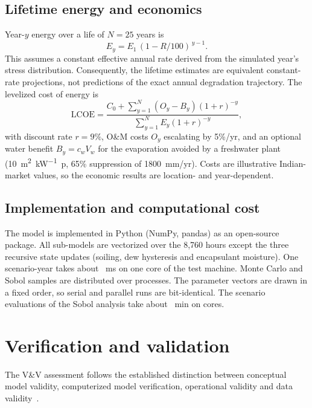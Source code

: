 \documentclass[preprint,11pt]{elsarticle}
\begin{document}
\subsection{Lifetime energy and economics}
Year-$y$ energy over a life of $N=25$ years is
\begin{equation}
E_y = E_1\,(1-R/100)^{\,y-1}.
\label{eq:lifetime}
\end{equation}
This assumes a constant effective annual rate derived
from the simulated year's stress distribution. Consequently, the lifetime estimates are equivalent constant-rate
projections, not predictions of the exact annual degradation trajectory. The levelized cost of energy is
\begin{equation}
\mathrm{LCOE} = \frac{C_0 + \sum_{y=1}^{N} (O_y - B_y)(1+r)^{-y}}{\sum_{y=1}^{N}E_y(1+r)^{-y}},
\label{eq:lcoe}
\end{equation}
with discount rate $r=9\%$, O\&M costs $O_y$ escalating by 5\%/yr, and an optional water benefit $B_y=c_wV_w$ for the
evaporation avoided by a freshwater plant (\SI{10}{\square\metre\per\kilo\watt p}, 65\% suppression of
\SI{1800}{mm/yr}). Costs are illustrative Indian-market values, so the economic results are location- and
year-dependent.

\subsection{Implementation and computational cost}
The model is implemented in Python (NumPy, pandas) as an open-source package. All sub-models are vectorized over the
8,760 hours except the three recursive state updates (soiling, dew hysteresis and encapsulant moisture). One scenario-year
takes about \RunTimeMs~ms on one core of the test machine. Monte Carlo and Sobol samples are distributed over
\NCores{} processes. The parameter vectors are drawn in a fixed order, so serial and parallel runs are bit-identical.
The \SobolEvals{} scenario evaluations of the Sobol analysis take about \SobolWallMin~min on \NCores{} cores.

\section{Verification and validation}\label{sec:vv}

The V\&V assessment follows the established distinction between conceptual model validity, computerized model
verification, operational validity and data validity~\cite{sargent2013,oberkampf2010}.
\end{document}
